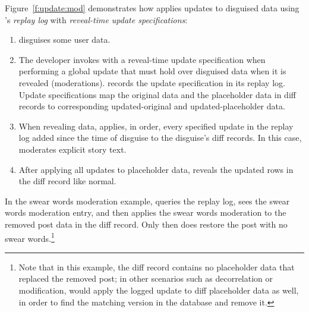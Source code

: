 %
Figure~\ref{f:update:mod} demonstrates how \sys applies updates to
disguised data using \sys's \emph{replay log} with \emph{reveal-time
update specifications}:
\begin{enumerate}[nosep]
    \item[(1)] \sys disguises some user data.
    \item[(2)] The developer invokes \sys with a reveal-time
        update specification when 
performing a global update that must hold over disguised data when it is
        revealed (\eg moderations). \sys records the update specification in its
        replay log. Update specifications map the original data and the
        placeholder data in diff records to corresponding updated-original and
        updated-placeholder data. 
    \item[(3)] When revealing data, \sys applies, in order, every specified
        update in the
        replay log added since the time of disguise to the disguise's diff
        records. In this case, \sys moderates explicit story text.
\item[(4)] After applying all updates to placeholder data, \sys reveals the
    updated rows in the diff record like normal.
\end{enumerate}
%
%
%
In the swear words moderation example, \sys queries the replay log, sees
the swear words moderation entry, and then applies the swear words moderation to
the removed post data in the diff record. Only then does \sys restore the post
with no swear words.\footnote{Note that in this example, the diff
record contains no placeholder data that replaced the removed post; in other
scenarios such as decorrelation or modification, \sys would apply the logged
update to diff placeholder data as well, in order to find the matching version in the
database and remove it.}

